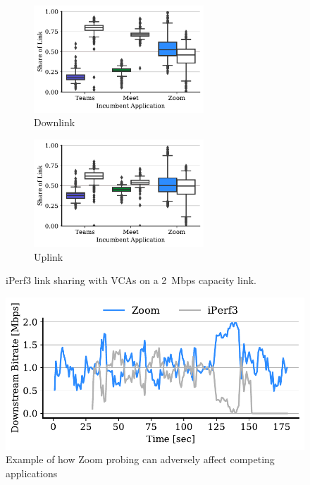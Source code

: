 
\begin{figure}[t!]
\centering
\begin{subfigure}[t]{.5\textwidth}
    \centering
    \includegraphics[width=0.7\textwidth]{figures/comp/box_plot_iperf_dl_2.0_all.pdf}
    \caption{Downlink}
    \label{subfig:boxplot-iperf-dl}
\end{subfigure}\hfill
\begin{subfigure}[t]{.5\textwidth}
    \centering
    \includegraphics[width=0.7\textwidth]{figures/comp/box_plot_iperfup_ul_2.0_all.pdf}
    \caption{Uplink}
    \label{subfig:boxplot-iperf-ul}
\end{subfigure}
\caption{iPerf3 link sharing with VCAs on a 2~Mbps capacity link.}
\label{fig:boxplot-iperf}
\end{figure}

\begin{figure}[th]
    \centering
    \includegraphics[width=\linewidth]{figures/comp_ts/zoom_iperf_2_dl_r3.pdf}
    \caption{Example of how Zoom probing can adversely affect competing applications}
	\label{fig:zoom-iperf-dl-2}
\end{figure}


